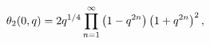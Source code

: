 \[\mathop{\theta_{2}\/}\nolimits\!\left(0,q\right)=2q^{1/4}\prod\limits_{n=1}^{%
\infty}\left(1-q^{2n}\right)\left(1+q^{2n}\right)^{2},\]